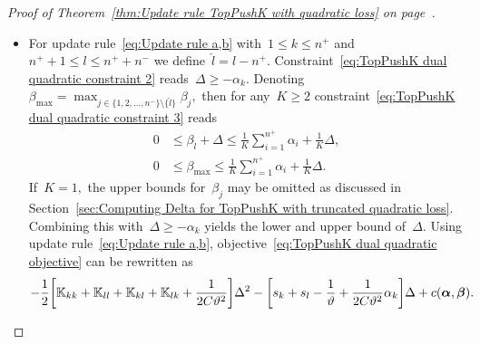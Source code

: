 \begin{proof}[Proof of Theorem~\ref{thm:Update rule TopPushK with quadratic loss} on page~\pageref{thm:Update rule TopPushK with quadratic loss}]
\begin{itemize}
    \item For update rule~\eqref{eq:Update rule a,b} with~$1 \le k \le n^+$ and~$n^+ + 1 \le l \le n^+ + n^-$ we define~$\hat{l} = l - n^+.$ Constraint~\eqref{eq:TopPushK dual quadratic constraint 2} reads~$\Delta \geq - \alpha_k.$ Denoting~$\beta_{\max} = \max_{j \in \{1, 2, \ldots, n^- \} \setminus \{\hat l\}} \beta_j,$ then for any~$K \geq 2$ constraint~\eqref{eq:TopPushK dual quadratic constraint 3} reads
    \begin{equation}\label{eq: TopPushK dual quadratic a,b - bounds}
      \begin{aligned}
        0 & \leq \beta_{\hat{l}} + \Delta \leq \frac{1}{K} \sum_{i = 1}^{n^+} \alpha_i + \frac{1}{K} \Delta, \\
        0 & \leq \beta_{\max} \leq \frac{1}{K} \sum_{i = 1}^{n^+} \alpha_i + \frac{1}{K} \Delta.
      \end{aligned}
    \end{equation}
    If~$K = 1,$ the upper bounds for~$\beta_j$ may be omitted as discussed in Section~\ref{sec:Computing Delta for TopPushK with truncated quadratic loss}. Combining this with~$\Delta \geq - \alpha_k$ yields the lower and upper bound of~$\Delta.$ Using update rule~\eqref{eq:Update rule a,b}, objective~\eqref{eq:TopPushK dual quadratic objective} can be rewritten as
    \begin{equation*}
      - \frac{1}{2} \Brac[s]{\K_{kk} + \K_{ll} + \K_{kl} + \K_{lk} + \frac{1}{2C\vartheta^2}} \Delta^2 - \Brac[s]{s_k + s_l - \frac{1}{\vartheta} + \frac{1}{2C\vartheta^2} \alpha_k} \Delta + c(\bm{\alpha}, \bm{\beta}).
    \end{equation*}


\end{itemize}
\end{proof}
